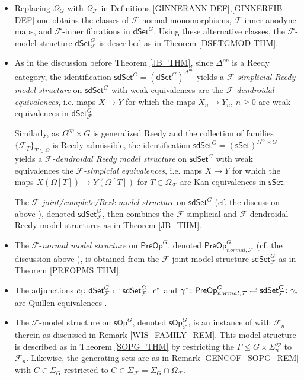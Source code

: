 \documentclass[a4paper,10pt
,draft
]{article}%
\numberwithin{equation}{section}
\numberwithin{figure}{section}
\theoremstyle{definition} %
\newcommand{\sSet}{\ensuremath{\mathsf{sSet}}}%
\newcommand{\sOp}{\ensuremath{\mathsf{sOp}}}%
\newcommand{\dSet}{\mathsf{dSet}}
\newcommand{\sdSet}{\mathsf{sdSet}}
\newcommand{\PreOp}{\mathsf{PreOp}}
\newcommand{\F}{\ensuremath{\mathcal F}}
\newcommand{\1}{\ensuremath{\mathbbm 1}}%
\begin{document}
\begin{itemize}
	\item Replacing $\Omega_G$ with $\Omega_\F$
	in Definitions \ref{GINNERANN DEF},\ref{GINNERFIB DEF}
	one obtains the classes of 
	$\F$-normal monomorphisms, $\F$-inner anodyne maps,
	and $\F$-inner fibrations in $\mathsf{dSet}^G$.
	Using these alternative classes,
	the $\F$-model structure
	$\mathsf{dSet}^G_{\F}$
	\cite[Thm. 2.2]{Per18}
	is described as in Theorem \ref{DSETGMOD THM}.

\item As in the discussion before Theorem \ref{JB_THM},
	since $\Delta^{op}$ is a Reedy category,
	the identification $\sdSet^G = (\dSet^G)^{\Delta^{op}}$
	yields a \emph{$\F$-simplicial Reedy model structure} on $\sdSet^G$
	with weak equivalences are the 
	\textit{$\F$-dendroidal equivalences},
	i.e. maps $X\to Y$ for which the maps 
	$X_n \to Y_n$, $n\geq 0$ are weak equivalences in $\dSet^G_\F$.
	
	Similarly, as $\Omega^{op}\times G$ is generalized Reedy and the collection of families $\{\F_T\}_{T \in \Omega}$
	is Reedy admissible,
	the identification $\sdSet^G = (\sSet)^{\Omega^{op} \times G}$
	yields a \emph{$\F$-dendroidal Reedy model structure} on $\sdSet^G$
	with weak equivalences the 
	\textit{$\F$-simplcial equivalences},
	i.e. maps $X\to Y$ for which the maps 
	$X(\Omega[T]) \to Y(\Omega[T])$ for $T \in \Omega_\F$
	are Kan equivalences in $\sSet$.	
	
	The \emph{$\F$-joint/complete/Rezk model structure} on 
	$\mathsf{sdSet}^G$
	(cf. the discussion above \cite[Thm. 6.7]{BP_edss}), 
	denoted $\mathsf{sdSet}^G_{\F}$,
	then combines the $\F$-simplicial and $\F$-dendroidal Reedy model structures as in Theorem \ref{JB_THM}.
	
	\item The $\F$-\emph{normal model structure} on $\PreOp^G$,
	denoted $\PreOp^G_{normal,\F}$
	(cf. the discussion above \cite[Thm. 6.8]{BP_edss}),
	is obtained from the $\F$-joint model structure 
	$\mathsf{sdSet}^G_{\F}$
	as in Theorem \ref{PREOPMS THM}.

	\item The adjunctions
	$c_! \colon \mathsf{dSet}^G_{\F} 
	\rightleftarrows
	\mathsf{sdSet}^G_{\F} \colon c^{\**}$
	and
	$\gamma^{\**} \colon \mathsf{PreOp}^G_{normal,\F} 
	\rightleftarrows
	\mathsf{sdSet}^G_{\F} \colon \gamma_{\**}$
	are Quillen equivalences \cite[Thms. 6.7 and 6.8]{BP_edss}.
	
	\item The $\F$-model structure on $\sOp^G$, 
		denoted $\sOp^G_{\F}$,
		is an instance of 
		\cite[Thm. \ref{AC-THMA}]{BP_ACOP} with $\F_n$ therein as 	discussed in Remark \ref{WIS_FAMILY_REM}.
		This model structure is described as in 
		Theorem \ref{SOPG_THM} by restricting the 
		$\Gamma \leq G \times \Sigma_n^{op}$ to $\F_n$.
		Likewise, the generating sets are as in
		Remark \ref{GENCOF_SOPG_REM}
		with $C \in \Sigma_G$ restricted to 
		$C \in \Sigma_{\F} = \Sigma_G \cap \Omega_{\F}$.
\end{itemize}
\end{document}
